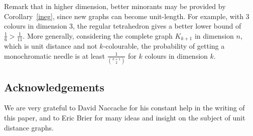 \documentclass[a4paper,11pt]{article}
\theoremstyle{definition}
\theoremstyle{remark}
\begin{document}
Remark that in higher dimension, better minorants may be provided by 
Corollary~\ref{ineg}, since new graphs can 
become unit-length. For example, with $3$ colours in dimension $3$, the regular 
tetrahedron gives a better lower bound 
of $\frac 1 6 >\frac 1 {11}$. More generally, considering the complete graph 
$K_{k+1}$ in dimension $n$, which is unit distance and not $k$-colourable, the 
probability of getting a monochromatic needle is at least $\frac{1}{\binom{k+1}{2}}$ 
for $k$ colours in dimension $k$.

\subsection*{Acknowledgements}
We are very grateful to David Naccache for his constant help in the writing of
this paper, and to Eric Brier for many ideas and insight on the subject of 
unit distance graphs.



\end{document}
